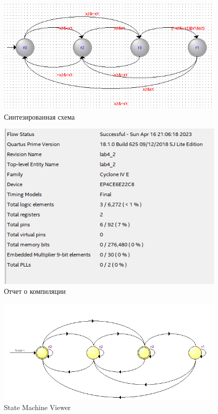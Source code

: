 \documentclass[a4paper,12pt]{article}
\begin{document}
    \begin{figure}[H]
        \centering
        \includegraphics[width=\linewidth]{polytech/scheme/report-lab4/subfiles/images/scheme_machine}
        \caption{Синтезированная схема}
    \end{figure}
    \begin{figure}[H]
        \centering
        \includegraphics[width=0.7\linewidth]{polytech/scheme/report-lab4/subfiles/images/compile_machine}
        \caption{Отчет о компиляции}
    \end{figure}
    \begin{figure}[H]
        \centering
        \includegraphics[width=\linewidth]{polytech/scheme/report-lab4/subfiles/images/smv}
        \caption{State Machine Viewer}
    \end{figure}
\end{document}
